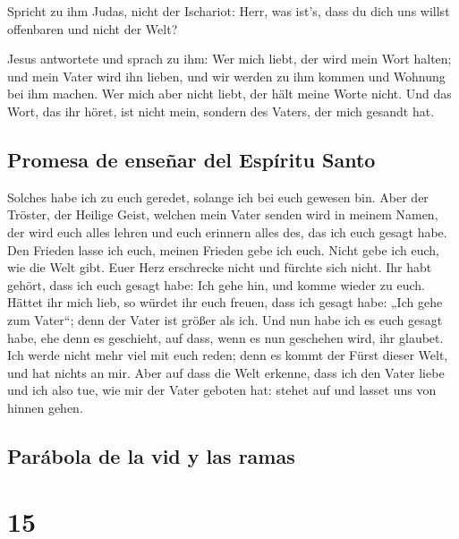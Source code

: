  Spricht zu ihm Judas, nicht der Ischariot: Herr, was
ist's, dass du dich uns willst offenbaren und nicht der Welt?

 Jesus antwortete und sprach zu ihm: Wer mich liebt, der
wird mein Wort halten; und mein Vater wird ihn lieben, und wir werden zu
ihm kommen und Wohnung bei ihm machen.  Wer mich aber
nicht liebt, der hält meine Worte nicht. Und das Wort, das ihr höret,
ist nicht mein, sondern des Vaters, der mich gesandt hat.

\hypertarget{promesa-de-enseuxf1ar-del-espuxedritu-santo}{%
\subsection{Promesa de enseñar del Espíritu
Santo}\label{promesa-de-enseuxf1ar-del-espuxedritu-santo}}

 Solches habe ich zu euch geredet, solange ich bei euch
gewesen bin.  Aber der Tröster, der Heilige Geist,
welchen mein Vater senden wird in meinem Namen, der wird euch alles
lehren und euch erinnern alles des, das ich euch gesagt habe.
 Den Frieden lasse ich euch, meinen Frieden gebe ich
euch. Nicht gebe ich euch, wie die Welt gibt. Euer Herz erschrecke nicht
und fürchte sich nicht.  Ihr habt gehört, dass ich euch
gesagt habe: Ich gehe hin, und komme wieder zu euch. Hättet ihr mich
lieb, so würdet ihr euch freuen, dass ich gesagt habe: „Ich gehe zum
Vater``; denn der Vater ist größer als ich.  Und nun habe
ich es euch gesagt habe, ehe denn es geschieht, auf dass, wenn es nun
geschehen wird, ihr glaubet.  Ich werde nicht mehr viel
mit euch reden; denn es kommt der Fürst dieser Welt, und hat nichts an
mir.  Aber auf dass die Welt erkenne, dass ich den Vater
liebe und ich also tue, wie mir der Vater geboten hat: stehet auf und
lasset uns von hinnen gehen.

\hypertarget{paruxe1bola-de-la-vid-y-las-ramas}{%
\subsection{Parábola de la vid y las
ramas}\label{paruxe1bola-de-la-vid-y-las-ramas}}

\hypertarget{section-14}{%
\section{15}\label{section-14}}

